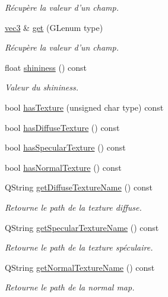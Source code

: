 \begin{DoxyCompactItemize}
\begin{DoxyCompactList}\small\item\em Récupère la valeur d'un champ. \end{DoxyCompactList}\item 
\hyperlink{structvec3}{vec3} \& \hyperlink{class_material_a229d118ec5602033bafbc1212a7b72ce}{get} (G\+Lenum type)
\begin{DoxyCompactList}\small\item\em Récupère la valeur d'un champ. \end{DoxyCompactList}\item 
float \hyperlink{class_material_a9a938aa96f0d5a5dc4d17d43cfd4b42b}{shininess} () const 
\begin{DoxyCompactList}\small\item\em Valeur du shininess. \end{DoxyCompactList}\item 
bool \hyperlink{class_material_a5a489f2fa09381b917c6bc3244e02877}{has\+Texture} (unsigned char type) const 
\item 
bool \hyperlink{class_material_aa07bc322b6904dd4ccf61620a0eb703c}{has\+Diffuse\+Texture} () const 
\item 
bool \hyperlink{class_material_ab1d0beef91e6149c0ebfc6c82b977889}{has\+Specular\+Texture} () const 
\item 
bool \hyperlink{class_material_a9bfe6c055d9af6f3ef029b62cc57e6a1}{has\+Normal\+Texture} () const 
\item 
Q\+String \hyperlink{class_material_a9305ced3fea7ab22cd25877e14cfb53c}{get\+Diffuse\+Texture\+Name} () const 
\begin{DoxyCompactList}\small\item\em Retourne le path de la texture diffuse. \end{DoxyCompactList}\item 
Q\+String \hyperlink{class_material_a0f33deb2e971506b9382d1ece4ff2fa6}{get\+Specular\+Texture\+Name} () const 
\begin{DoxyCompactList}\small\item\em Retourne le path de la texture spéculaire. \end{DoxyCompactList}\item 
Q\+String \hyperlink{class_material_ae72d423e9f07b3cc0388854e0ad2c1ca}{get\+Normal\+Texture\+Name} () const 
\begin{DoxyCompactList}\small\item\em Retourne le path de la normal map. \end{DoxyCompactList}\item 

\end{DoxyCompactItemize}
